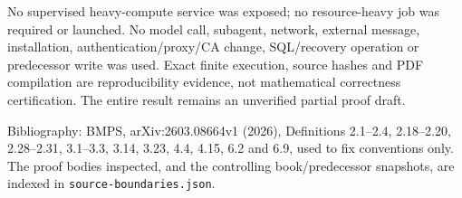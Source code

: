 \documentclass[
  11pt,
]{article}
\begin{document}
No supervised heavy-compute service was exposed; no resource-heavy job
was required or launched. No model call, subagent, network, external
message, installation, authentication/proxy/CA change, SQL/recovery
operation or predecessor write was used. Exact finite execution, source
hashes and PDF compilation are reproducibility evidence, not
mathematical correctness certification. The entire result remains an
unverified partial proof draft.

Bibliography: BMPS, arXiv:2603.08664v1 (2026), Definitions 2.1--2.4,
2.18--2.20, 2.28--2.31, 3.1--3.3, 3.14, 3.23, 4.4, 4.15, 6.2 and 6.9,
used to fix conventions only. The proof bodies inspected, and the
controlling book/predecessor snapshots, are indexed in
\texttt{source-boundaries.json}.
\end{document}
